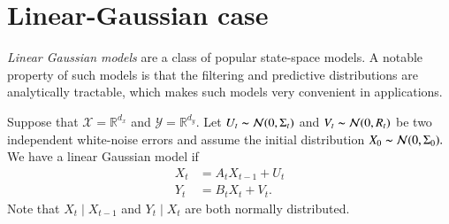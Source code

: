\documentclass[
]{book}
\theoremstyle{break}
\theoremstyle{nonumberplain}
\begin{document}
\chapter{Linear-Gaussian case}

\textit{Linear Gaussian models} are a class of popular state-space
models. A notable property of such models is that the filtering and
predictive distributions are analytically tractable, which makes such
models very convenient in applications.

Suppose that \(\mathcal X=\mathbb R^{d_x}\) and
\(\mathcal Y=\mathbb R^{d_y}.\) Let
\(U_t\thicksim\mathcal N(0,\Sigma_t)\) and
\(V_t\thicksim\mathcal N(0,R_t)\) be two independent white-noise errors
and assume the initial distribution
\(X_0\thicksim\mathcal N(0,\Sigma_0).\) We have a linear Gaussian model
if \begin{align}
X_t &= A_tX_{t-1}+U_t \\
Y_t &= B_tX_t + V_t.
\end{align} Note that \(X_t\mid X_{t-1}\) and \(Y_t\mid X_t\) are both
normally distributed.
\end{document}
